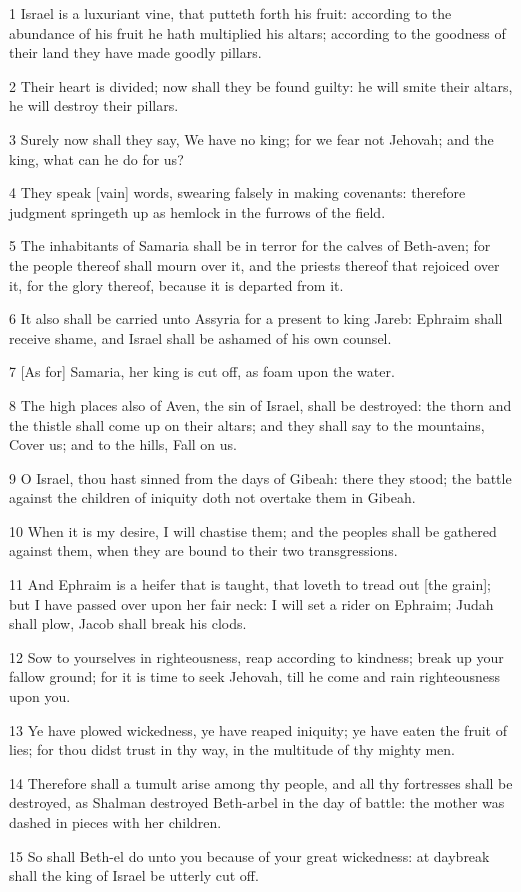 \par 1 Israel is a luxuriant vine, that putteth forth his fruit: according to the abundance of his fruit he hath multiplied his altars; according to the goodness of their land they have made goodly pillars.
\par 2 Their heart is divided; now shall they be found guilty: he will smite their altars, he will destroy their pillars.
\par 3 Surely now shall they say, We have no king; for we fear not Jehovah; and the king, what can he do for us?
\par 4 They speak [vain] words, swearing falsely in making covenants: therefore judgment springeth up as hemlock in the furrows of the field.
\par 5 The inhabitants of Samaria shall be in terror for the calves of Beth-aven; for the people thereof shall mourn over it, and the priests thereof that rejoiced over it, for the glory thereof, because it is departed from it.
\par 6 It also shall be carried unto Assyria for a present to king Jareb: Ephraim shall receive shame, and Israel shall be ashamed of his own counsel.
\par 7 [As for] Samaria, her king is cut off, as foam upon the water.
\par 8 The high places also of Aven, the sin of Israel, shall be destroyed: the thorn and the thistle shall come up on their altars; and they shall say to the mountains, Cover us; and to the hills, Fall on us.
\par 9 O Israel, thou hast sinned from the days of Gibeah: there they stood; the battle against the children of iniquity doth not overtake them in Gibeah.
\par 10 When it is my desire, I will chastise them; and the peoples shall be gathered against them, when they are bound to their two transgressions.
\par 11 And Ephraim is a heifer that is taught, that loveth to tread out [the grain]; but I have passed over upon her fair neck: I will set a rider on Ephraim; Judah shall plow, Jacob shall break his clods.
\par 12 Sow to yourselves in righteousness, reap according to kindness; break up your fallow ground; for it is time to seek Jehovah, till he come and rain righteousness upon you.
\par 13 Ye have plowed wickedness, ye have reaped iniquity; ye have eaten the fruit of lies; for thou didst trust in thy way, in the multitude of thy mighty men.
\par 14 Therefore shall a tumult arise among thy people, and all thy fortresses shall be destroyed, as Shalman destroyed Beth-arbel in the day of battle: the mother was dashed in pieces with her children.
\par 15 So shall Beth-el do unto you because of your great wickedness: at daybreak shall the king of Israel be utterly cut off.

